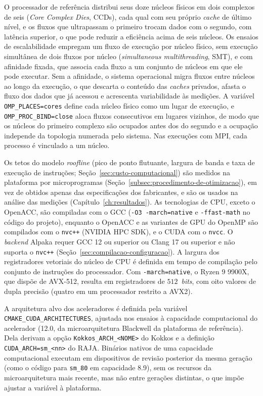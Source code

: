 O processador de referência distribui seus doze núcleos físicos em dois complexos de seis (\textit{Core Complex Dies}, CCDs), cada qual com seu próprio \textit{cache} de último nível, e os fluxos que ultrapassam o primeiro trocam dados com o segundo, com latência superior, o que pode reduzir a eficiência acima de seis núcleos.
Os ensaios de escalabilidade empregam um fluxo de execução por núcleo físico, sem execução simultânea de dois fluxos por núcleo (\textit{simultaneous multithreading}, SMT), e com afinidade fixada, que associa cada fluxo a um conjunto de núcleos em que ele pode executar.
Sem a afinidade, o sistema operacional migra fluxos entre núcleos ao longo da execução, o que descarta o conteúdo das \textit{caches} privados, afasta o fluxo dos dados que já acessou e acrescenta variabilidade às medições.
A variável \texttt{OMP\_PLACES=cores} define cada núcleo físico como um lugar de execução, e \texttt{OMP\_PROC\_BIND=close} aloca fluxos consecutivos em lugares vizinhos, de modo que os núcleos do primeiro complexo são ocupados antes dos do segundo e a ocupação independe da topologia numerada pelo sistema.
Nas execuções com MPI, cada processo é vinculado a um núcleo.

Os tetos do modelo \textit{roofline} (pico de ponto flutuante, largura de banda e taxa de execução de instruções; Seção~\ref{sec:custo-computacional}) são medidos na plataforma por microprogramas (Seção~\ref{subsec:procedimento-de-otimizacao}), em vez de obtidos apenas das especificações dos fabricantes, e são os usados na análise das medições (Capítulo~\ref{ch:resultados}).
As tecnologias de CPU, exceto o OpenACC, são compiladas com o GCC (\texttt{-O3 -march=native} e \texttt{-ffast-math} no código do projeto), enquanto o OpenACC e as variantes de GPU do OpenMP são compilados com o \texttt{nvc++} (NVIDIA HPC SDK), e o CUDA com o \texttt{nvcc}.
O \textit{backend} Alpaka requer GCC 12 ou superior ou Clang 17 ou superior e não suporta o \texttt{nvc++} (Seção~\ref{sec:compilacao-configuracao}).
A largura dos registradores vetoriais do núcleo de CPU é definida em tempo de compilação pelo conjunto de instruções do processador.
Com \texttt{-march=native}, o Ryzen 9 9900X, que dispõe de AVX-512, resulta em registradores de $512$~\textit{bits}, com oito valores de dupla precisão (quatro em um processador restrito a AVX2).

A arquitetura alvo dos aceleradores é definida pela variável \texttt{CMAKE\_\allowbreak CUDA\_\allowbreak ARCHITECTURES}, ajustada nos ensaios à capacidade computacional do acelerador (12.0, da microarquitetura Blackwell da plataforma de referência).
Dela derivam a opção \texttt{Kokkos\_ARCH\_<NOME>} do Kokkos e a definição \texttt{CUDA\_ARCH=sm\_<nn>} do RAJA.
Binários nativos de uma capacidade computacional executam em dispositivos de revisão posterior da mesma geração (como o código para \texttt{sm\_80} em capacidade 8.9), sem os recursos da microarquitetura mais recente, mas não entre gerações distintas, o que impõe ajustar a variável à plataforma.

